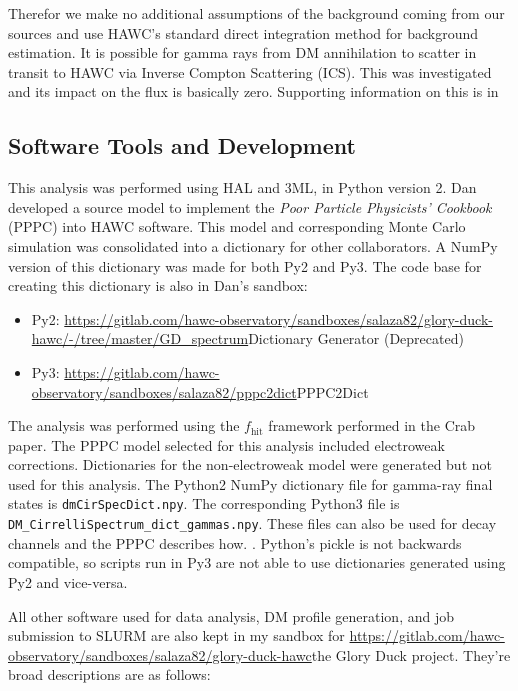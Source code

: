 Therefor we make no additional assumptions of the background coming from our sources and use HAWC's standard direct integration method for background estimation.
It is possible for gamma rays from DM annihilation to scatter in transit to HAWC via Inverse Compton Scattering (ICS).
This was investigated and its impact on the flux is basically zero.
Supporting information on this is in 

\subsection{Software Tools and Development}\label{sec:gd_tools}

This analysis was performed using HAL and 3ML, in Python version 2.\cite{Abeysekara_2017, vianello2015multimission}
Dan developed a source model to implement the \emph{Poor Particle Physicists' Cookbook} (PPPC) \cite{Cirelli_2011} into HAWC software.
This model and corresponding Monte Carlo simulation was consolidated into a dictionary for other collaborators.
A NumPy version of this dictionary was made for both Py2 and Py3.
The code base for creating this dictionary is also in Dan's sandbox:

\begin{itemize}
    \item Py2: \url{https://gitlab.com/hawc-observatory/sandboxes/salaza82/glory-duck-hawc/-/tree/master/GD_spectrum}{Dictionary Generator (Deprecated)}
    \item Py3: \url{https://gitlab.com/hawc-observatory/sandboxes/salaza82/pppc2dict}{PPPC2Dict}
\end{itemize}

The analysis was performed using the $f_{\textrm{hit}}$ framework performed in the Crab paper\cite{Abeysekara_2017}.
The PPPC model selected for this analysis included electroweak corrections.
Dictionaries for the non-electroweak model were generated but not used for this analysis.
The Python2 NumPy dictionary file for gamma-ray final states is \texttt{dmCirSpecDict.npy}.
The corresponding Python3 file is \texttt{DM\_CirrelliSpectrum\_dict\_gammas.npy}.
These files can also be used for decay channels and the PPPC describes how. \cite{Cirelli_2011}.
Python's pickle is not backwards compatible, so scripts run in Py3 are not able to use dictionaries generated using Py2 and vice-versa.

All other software used for data analysis, DM profile generation, and job submission to SLURM are also kept in my sandbox for \url{https://gitlab.com/hawc-observatory/sandboxes/salaza82/glory-duck-hawc}{the Glory Duck} project. They're broad descriptions are as follows:

